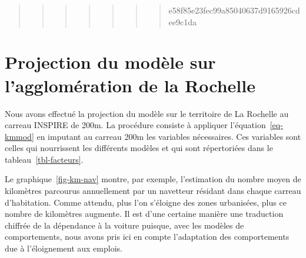 \documentclass[
  9pt,
  a4paper,
  DIV=11]{scrreprt}
\begin{document}
\begin{quote}
\begin{quote}
\begin{quote}
\begin{quote}
\begin{quote}
\begin{quote}
\begin{quote}
e58f85e23fec99a85040637d9165926cdee9c1da
\end{quote}
\end{quote}
\end{quote}
\end{quote}
\end{quote}
\end{quote}
\end{quote}

\chapter{Projection du modèle sur l'agglomération de la
Rochelle}\label{projection-du-moduxe8le-sur-lagglomuxe9ration-de-la-rochelle}

Nous avons effectué la projection du modèle sur le territoire de La
Rochelle au carreau INSPIRE de 200m. La procédure consiste à appliquer
l'équation~\ref{eq-kmmod} en imputant au carreau 200m les variables
nécessaires. Ces variables sont celles qui nourrissent les différents
modèles et qui sont répertoriées dans le tableau~\ref{tbl-facteurs}.

Le graphique~\ref{fig-km-nav} montre, par exemple, l'estimation du
nombre moyen de kilomètres parcourus annuellement par un navetteur
résidant dans chaque carreau d'habitation. Comme attendu, plus l'on
s'éloigne des zones urbanisées, plus ce nombre de kilomètres augmente.
Il est d'une certaine manière une traduction chiffrée de la dépendance à
la voiture puisque, avec les modèles de comportements, nous avons pris
ici en compte l'adaptation des comportements due à l'éloignement aux
emplois.
\end{document}
